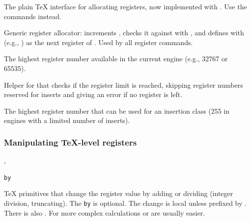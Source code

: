 \documentclass{l3in2edoc}
\begin{document}
\begin{function}[int]
  {
    \alloc@
  }
  The plain \TeX{} interface for allocating registers, now implemented
  with . Use the  commands instead.
\end{function}

\begin{function}[int]
  {
    \e@alloc
  }
  \begin{syntax}
          
  \end{syntax}
  Generic register allocator: increments , checks it
  against  with , and defines  with
   (e.g., ) as the next register of
  . Used by all  register commands.
\end{function}

\begin{function}[int]
  {
    \e@alloc@top
  }
  The highest register number available in the current engine
  (e.g., 32767 or 65535).
\end{function}



\begin{function}[int]
  {
    \e@ch@ck
  }
  Helper for  that checks if the register limit is
  reached, skipping register numbers reserved for inserts and
  giving an error if no register is left.
\end{function}



\begin{function}[int]
  {
    \e@insert@top
  }
  The highest register number that can be used for an insertion class
  (255 in engines with a limited number of inserts).
\end{function}



\subsubsection{Manipulating \TeX{}-level registers}


\begin{function}[]
  {
    \advance,
    \divide
  }
  \begin{syntax}
      \texttt{by} 
  \end{syntax}

  \TeX{} primitives that change the register value by adding or
  dividing (integer division, truncating). The \texttt{by} is
  optional. The change is local unless prefixed by . There
  is also . For more complex calculations 
  or  are usually easier.

\end{function}
\end{document}
